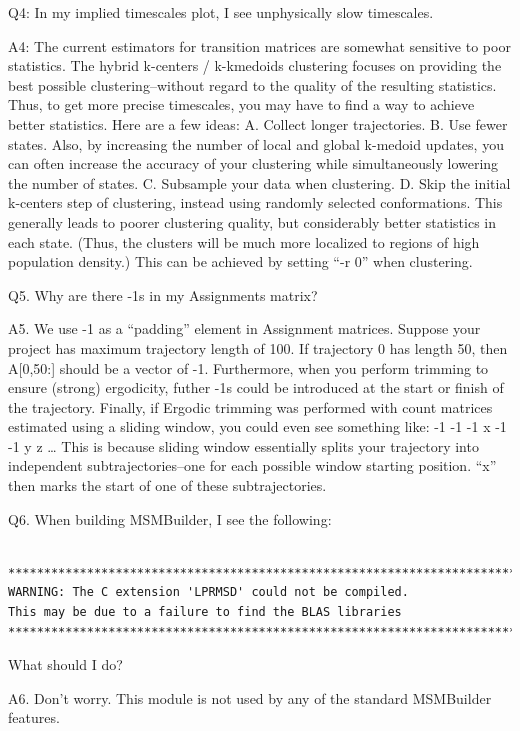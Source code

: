 \documentclass[12pt]{article}
\begin{document}
\vspace{5mm}

Q4:  In my implied timescales plot, I see unphysically slow timescales.  

A4:  The current estimators for transition matrices are somewhat sensitive to poor statistics.  The hybrid k-centers / k-kmedoids clustering focuses on providing the best possible clustering--without regard to the quality of the resulting statistics.  Thus, to get more precise timescales, you may have to find a way to achieve better statistics.  Here are a few ideas:
	A.  Collect longer trajectories.
	B.  Use fewer states.  Also, by increasing the number of local and global k-medoid updates, you can often increase the accuracy of your clustering while simultaneously lowering the number of states.  
	C.  Subsample your data when clustering.
	D.  Skip the initial k-centers step of clustering, instead using randomly selected conformations.  This generally leads to poorer clustering quality, but considerably better statistics in each state.  (Thus, the clusters will be much more localized to regions of high population density.)  This can be achieved by setting “-r 0” when clustering.  

\vspace{5mm}

Q5.  Why are there -1s in my Assignments matrix?

A5.  We use -1 as a “padding” element in Assignment matrices. Suppose your project has maximum trajectory length of 100.  If trajectory 0 has length 50, then A[0,50:] should be a vector of -1.  Furthermore, when you perform trimming to ensure (strong) ergodicity, futher -1s could be introduced at the start or finish of the trajectory.  Finally, if Ergodic trimming was performed with count matrices estimated using a sliding window, you could even see something like:
-1 -1 -1 x -1 -1 y z …
This is because sliding window essentially splits your trajectory into independent subtrajectories--one for each possible window starting position.  “x” then marks the start of one of these subtrajectories.


Q6.  When building MSMBuilder, I see the following: 
\begin{verbatim}
 ***************************************************************************
WARNING: The C extension 'LPRMSD' could not be compiled.
This may be due to a failure to find the BLAS libraries
***************************************************************************
\end{verbatim}

What should I do?

A6.  Don't worry.  This module is not used by any of the standard MSMBuilder features.  


\end{document}
